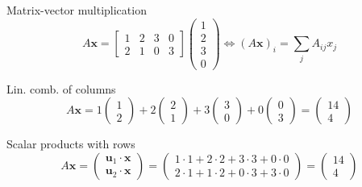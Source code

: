 \documentclass[10pt]{beamer}
\begin{document}
\begin{frame}{Matrix-vector multiplication}
    $$A \mathbf x = \begin{bmatrix}
        1 & 2 & 3 & 0 \\ 2 & 1 & 0 & 3 
    \end{bmatrix} \begin{pmatrix}1 \\ 2 \\ 3 \\ 0\end{pmatrix} \iff (A \mathbf x)_i = \sum\limits_j A_{ij} x_j$$
    \begin{block}{Lin. comb. of columns}
        $$A \mathbf x = 
        1 \begin{pmatrix}1 \\ 2\end{pmatrix} + 
        2 \begin{pmatrix}2 \\ 1\end{pmatrix} +
        3 \begin{pmatrix}3 \\ 0\end{pmatrix} +
        0 \begin{pmatrix}0 \\ 3\end{pmatrix} = 
        \begin{pmatrix}14 \\ 4\end{pmatrix}$$
    \end{block}
    \begin{block}{Scalar products with rows}
        $$
        A \mathbf x = \begin{pmatrix}
            \mathbf u_1 \cdot \mathbf x \\ \mathbf u_2 \cdot \mathbf x
        \end{pmatrix}= \begin{pmatrix}
            1 \cdot 1 + 2 \cdot 2 + 3 \cdot 3 + 0 \cdot 0 \\
            2 \cdot 1 + 1 \cdot 2 + 0 \cdot 3 + 3 \cdot 0
        \end{pmatrix} = \begin{pmatrix}14 \\ 4\end{pmatrix}
        $$
    \end{block}
\end{frame}
\end{document}
